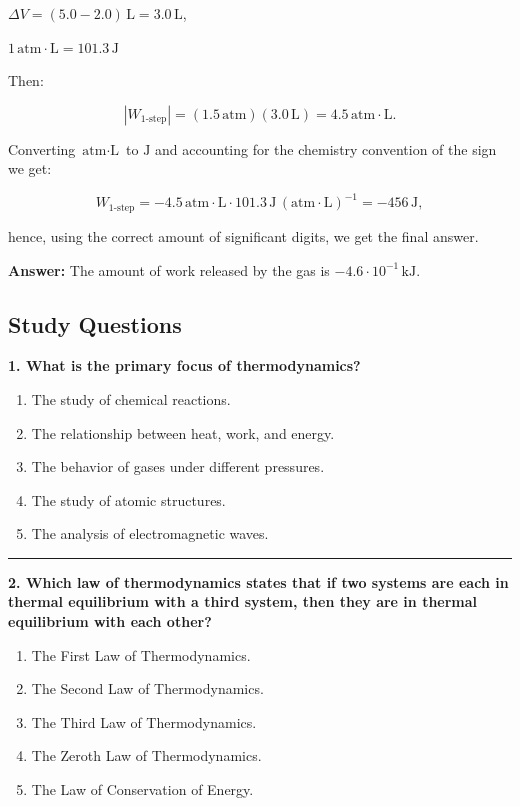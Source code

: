 \documentclass[
  9pt,
]{extbook}
\providecommand{\tightlist}{%
  \setlength{\itemsep}{0pt}\setlength{\parskip}{0pt}}
\theoremstyle{definition}
\theoremstyle{definition}
\theoremstyle{definition}
\theoremstyle{remark}
\begin{document}
\(\Delta V =(5.0-2.0)\,\text{L}=3.0\,\text{L}\),

\(1 \, \text{atm}\cdotp\text{L}=101.3\,\text{J}\)

Then:

\[\left| W_{\text{1-step}} \right|=(1.5\,\text{atm})(3.0\,\text{L}) = 4.5\,\text{atm}\cdotp \text{L}.\]

Converting \(\text{atm}\cdot\text{L}\) to \(\text{J}\) and accounting for the chemistry convention of the sign we get:

\[W_{\text{1-step}}= -4.5\,\text{atm}\cdotp \text{L} \cdot 101.3 \,\text{J}\,(\text{atm}\cdotp\text{L})^{-1} = -456\,\text{J},\]

hence, using the correct amount of significant digits, we get the final answer.

\textbf{Answer:} The amount of work released by the gas is \(-4.6 \cdot 10^{-1}\,\text{kJ}\).

\hypertarget{quest2}{%
\subsection{Study Questions}\label{quest2}}

\textbf{1. What is the primary focus of thermodynamics?}

\begin{enumerate}
\def\labelenumi{\alph{enumi}.}
\tightlist
\item
  The study of chemical reactions.
\item
  The relationship between heat, work, and energy.
\item
  The behavior of gases under different pressures.
\item
  The study of atomic structures.
\item
  The analysis of electromagnetic waves.
\end{enumerate}

\begin{center}\rule{0.5\linewidth}{0.5pt}\end{center}

\textbf{2. Which law of thermodynamics states that if two systems are each in thermal equilibrium with a third system, then they are in thermal equilibrium with each other?}

\begin{enumerate}
\def\labelenumi{\alph{enumi}.}
\tightlist
\item
  The First Law of Thermodynamics.
\item
  The Second Law of Thermodynamics.
\item
  The Third Law of Thermodynamics.
\item
  The Zeroth Law of Thermodynamics.
\item
  The Law of Conservation of Energy.
\end{enumerate}
\end{document}

